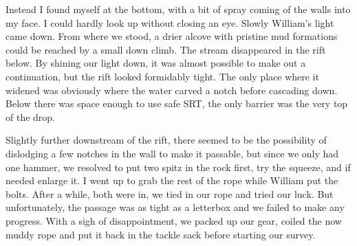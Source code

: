 Instead I found myself at the bottom, with a bit of spray coming of the walls into my face. I could hardly look up without closing an eye. Slowly William's light came down. From where we stood, a drier alcove with pristine mud formations could be reached by a small down climb. The stream disappeared in the rift below. By shining our light down, it was almost possible to make out a continuation, but the rift looked formidably tight. The only place where it widened was obviously where the water carved a notch before cascading down. Below there was space enough to use safe SRT, the only barrier was the very top of the drop.

Slightly further downstream of the rift, there seemed to be the possibility of dislodging a few notches in the wall to make it passable, but since we only had one hammer, we resolved to put two spitz in the rock first, try the squeeze, and if needed enlarge it. I went up to grab the rest of the rope while William put the bolts. After a while, both were in, we tied in our rope and tried our luck. But unfortunately, the passage was as tight as a letterbox and we failed to make any progress. With a sigh of disappointment, we packed up our gear, coiled the now muddy rope and put it back in the tackle sack before starting our survey. 

\begin{figure}[b!]
\centering
{}
\label{SS2014}
\end{figure}